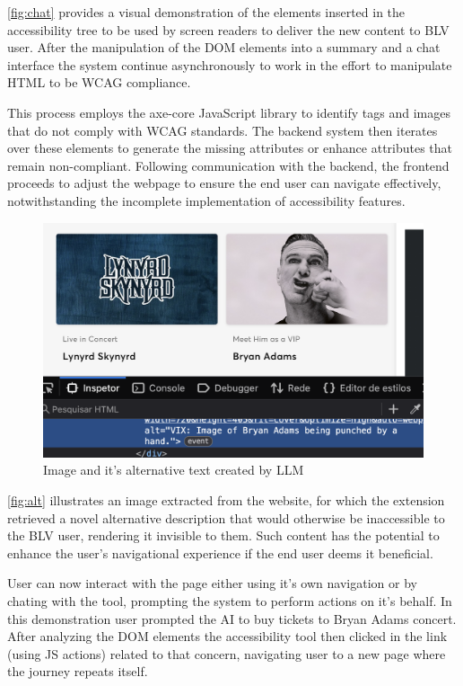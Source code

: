 \documentclass[conference]{IEEEtran}
\begin{document}
\autoref{fig:chat} provides a visual demonstration of the elements inserted in the accessibility tree to be used by screen readers to deliver the new content to BLV user. After the manipulation of the DOM elements into a summary and a chat interface the system continue asynchronously to work in the effort to manipulate HTML to be WCAG compliance.

This process employs the axe-core JavaScript library to identify tags and images that do not comply with WCAG standards. The backend system then iterates over these elements to generate the missing attributes or enhance attributes that remain non-compliant. Following communication with the backend, the frontend proceeds to adjust the webpage to ensure the end user can navigate effectively, notwithstanding the incomplete implementation of accessibility features.

\begin{figure}[h]
\centering
\includegraphics[width=\columnwidth]{images/3.png}
\caption{Image and it's alternative text created by LLM}
\label{fig:alt}
\end{figure}

\autoref{fig:alt} illustrates an image extracted from the website, for which the extension retrieved a novel alternative description that would otherwise be inaccessible to the BLV user, rendering it invisible to them. Such content has the potential to enhance the user's navigational experience if the end user deems it beneficial.

User can now interact with the page either using it's own navigation or by chating with the tool, prompting the system to perform actions on it's behalf. In this demonstration user prompted the AI to buy tickets to Bryan Adams concert. After analyzing the DOM elements the accessibility tool then clicked in the link (using JS actions) related to that concern, navigating user to a new page where the journey repeats itself.
\end{document}
